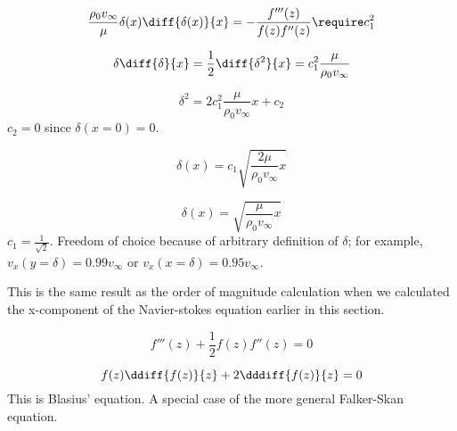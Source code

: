 \begin{equation}
\frac{\rho_0 v_\infty}{\mu} \delta(x) \diff{\delta(x)}{x} = -\frac{f'''(z)}{f(z)f''(z)} \require c_1^2
\end{equation}

\begin{equation}
\delta\diff{\delta}{x} = \frac{1}{2}\diff{\delta^2}{x} = c_1^2\frac{\mu}{\rho_0v_\infty}\\
\end{equation}

\begin{equation}
\delta^2 = 2c_1^2 \frac{\mu}{\rho_0v_\infty}x + c_2
\end{equation}
$c_2=0$ since $\delta(x=0)=0$.

\begin{equation}
\delta(x) = c_1\sqrt{\frac{2\mu}{\rho_0v_\infty}x}
\end{equation}

\begin{equation}
\delta(x)=\sqrt{\frac{\mu}{\rho_0v_\infty}x}
\end{equation}
$c_1=\frac{1}{\sqrt{2}}$. Freedom of choice because of arbitrary definition of $\delta$; for example, $v_x(y=\delta)=0.99v_\infty$ or $v_x(x=\delta)=0.95v_\infty$.

This is the same result as the order of magnitude calculation when we calculated the x-component of the Navier-stokes equation earlier in this section.

\begin{equation}
f'''(z) +\frac{1}{2} f(z)f''(z) = 0
\end{equation}

\begin{equation}
f(z)\ddiff{f(z)}{z}+2\dddiff{f(z)}{z}=0
\end{equation}
This is Blasius' equation. A special case of the more general Falker-Skan equation.



















